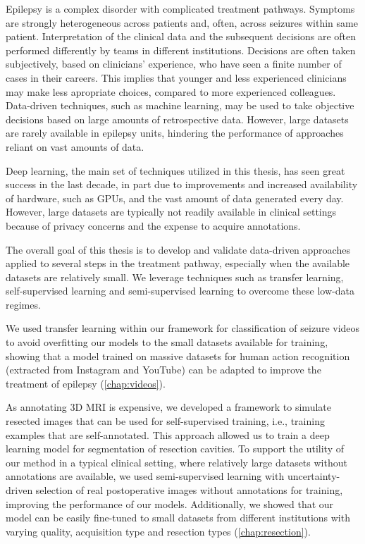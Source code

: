 Epilepsy is a complex disorder with complicated treatment pathways.
Symptoms are strongly heterogeneous across patients and, often, across seizures within same patient.
Interpretation of the clinical data and the subsequent decisions are often performed differently by teams in different institutions.
Decisions are often taken subjectively, based on clinicians' experience, who have seen a finite number of cases in their careers.
This implies that younger and less experienced clinicians may make less apropriate choices, compared to more experienced colleagues.
Data-driven techniques, such as machine learning, may be used to take objective decisions based on large amounts of retrospective data.
However, large datasets are rarely available in epilepsy units, hindering the performance of approaches reliant on vast amounts of data.

Deep learning, the main set of techniques utilized in this thesis, has seen great success in the last decade, in part due to improvements and increased availability of hardware, such as \acp{GPU}, and the vast amount of data generated every day.
However, large datasets are typically not readily available in clinical settings because of privacy concerns and the expense to acquire annotations.

The overall goal of this thesis is to develop and validate data-driven approaches applied to several steps in the treatment pathway, especially when the available datasets are relatively small.
We leverage techniques such as transfer learning, self-supervised learning and semi-supervised learning to overcome these low-data regimes.

We used transfer learning within our framework for classification of seizure videos to avoid overfitting our models to the small datasets available for training, showing that a model trained on massive datasets for human action recognition (extracted from Instagram and YouTube) can be adapted to improve the treatment of epilepsy (\cref{chap:videos}).

As annotating 3D \ac{MRI} is expensive, we developed a framework to simulate resected images that can be used for self-supervised training, i.e., training examples that are self-annotated.
This approach allowed us to train a deep learning model for segmentation of resection cavities.
To support the utility of our method in a typical clinical setting, where relatively large datasets without annotations are available, we used semi-supervised learning with uncertainty-driven selection of real postoperative images without annotations for training, improving the performance of our models.
Additionally, we showed that our model can be easily fine-tuned to small datasets from different institutions with varying quality, acquisition type and resection types (\cref{chap:resection}).

